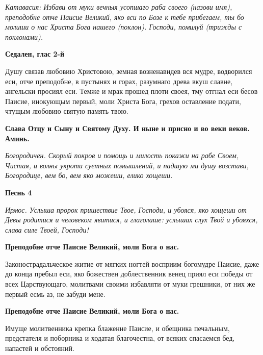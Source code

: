 \itshape Катавасия:\normalfont{} Избави от муки вечныя усопшаго раба своего (\itshape назови имя\normalfont{}), преподобне отче Паисие Великий, яко вси по Бозе к тебе прибегаем, ты бо молиши о нас Христа Бога нашего (\itshape поклон\normalfont{}). Господи, помилуй (\itshape трижды с поклонами\normalfont{}). 







\bfseries Седален, глас 2-й\normalfont{}\nopagebreak

Душу связав любовию Христовою, земная возненавидев вся мудре, водворился еси, отче преподобне, в пустынях и горах, разумнаго древа вкуш славне, ангельски просиял еси. Темже и мрак прошед плоти своея, тму отгнал еси бесов Паисие, инокующым первый, моли Христа Бога, грехов оставление подати, чтущым любовию святую память твою. 




\bfseries Слава Отцу и Сыну и Святому Духу. И ныне и присно и во веки веков. Аминь.\normalfont{} 




\itshape Богородичен.\normalfont{} Скорый покров и помощь и милость покажи на рабе Своем, Чистая, и волны укроти суетных помышлений, и падшую ми душу возстави, Богородице, вем бо, вем яко можеши, елико хощеши. 




\bfseries Песнь 4 \normalfont{}\nopagebreak




\itshape Ирмос.\normalfont{} Услыша пророк пришествие Твое, Господи, и убояся, яко хощеши от Девы родитися и человеком явитися, и глаголаше: услышах слух Твой и убояхся, слава силе Твоей, Господи! 




\bfseries Преподобне отче Паисие Великий, моли Бога о нас.\normalfont{} 




Законострадальческое житие от мягких ногтей восприим богомудре Паисие, даже до конца пребыл еси, яко божествен доблественник венец приял еси победы от всех Царствующаго, молитвами своими избавляти от муки грешники, от них же первый есмь аз, не забуди мене. 




\bfseries Преподобне отче Паисие Великий, моли Бога о нас.\normalfont{}\nopagebreak




Имуще молитвенника крепка блаженне Паисие, и обещника печальным, предстателя и поборника и ходатая благочестна, от всяких спасаемся бед, напастей и обстояний. 




